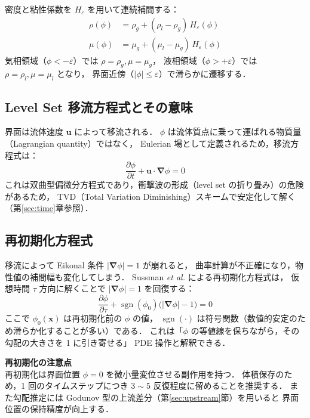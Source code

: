 \documentclass[12pt, a4paper, titlepage]{article}
\newcommand{\jp}[1]{{\normalfont\jpfont #1}}
\newcommand{\pd}[2]{\dfrac{\partial #1}{\partial #2}}
\newcommand{\bu}{\bm{u}}
\newcommand{\bnabla}{\bm{\nabla}}
\newcommand{\He}{H_\varepsilon}
\begin{document}
\jp{密度と粘性係数を $\He$ を用いて連続補間する：}
\begin{align}
  \rho(\phi) &= \rho_g + (\rho_l - \rho_g)\,\He(\phi)
  \label{eq:rho_interp}\\
  \mu(\phi)  &= \mu_g  + (\mu_l  - \mu_g )\,\He(\phi)
  \label{eq:mu_interp}
\end{align}
\jp{気相領域（$\phi<-\varepsilon$）では $\rho=\rho_g, \mu=\mu_g$，
液相領域（$\phi>+\varepsilon$）では $\rho=\rho_l, \mu=\mu_l$ となり，
界面近傍（$|\phi|\le\varepsilon$）で滑らかに遷移する．}

\subsection{Level Set \jp{移流方程式とその意味}}

\jp{界面は流体速度 $\bu$ によって移流される．
$\phi$ は流体質点に乗って運ばれる物質量（Lagrangian quantity）ではなく，
Eulerian 場として定義されるため，移流方程式は：}
\begin{equation}
  \pd{\phi}{t} + \bu \cdot \bnabla\phi = 0
  \label{eq:levelset_adv}
\end{equation}
\jp{これは双曲型偏微分方程式であり，衝撃波の形成（level set の折り畳み）の危険があるため，
TVD（Total Variation Diminishing）スキームで安定化して解く（第\ref{sec:time}章参照）．}

\subsection{\jp{再初期化方程式}}
\label{sec:reinit}

\jp{移流によって Eikonal 条件 $|\bnabla\phi|=1$ が崩れると，
曲率計算が不正確になり，物性値の補間幅も変化してしまう．
Sussman \textit{et al.} \cite{Sussman1994} による再初期化方程式は，
仮想時間 $\tau$ 方向に解くことで $|\bnabla\phi|=1$ を回復する：}
\begin{equation}
  \pd{\phi}{\tau} + \operatorname{sgn}(\phi_0)\bigl(|\bnabla\phi| - 1\bigr) = 0
  \label{eq:reinit}
\end{equation}
\jp{ここで $\phi_0(\bm{x})$ は再初期化前の $\phi$ の値，
$\operatorname{sgn}(\cdot)$ は符号関数（数値的安定のため滑らか化することが多い）である．
これは「$\phi$ の等値線を保ちながら，その勾配の大きさを 1 に引き寄せる」
PDE 操作と解釈できる．}

\begin{tcolorbox}[warnbox]
\textbf{\jp{再初期化の注意点}}\\
\jp{再初期化は界面位置 $\phi=0$ を微小量変位させる副作用を持つ．
体積保存のため，1 回のタイムステップにつき $3\sim5$ 反復程度に留めることを推奨する．
また勾配推定には Godunov 型の上流差分（第\ref{sec:upstream}節）を用いると
界面位置の保持精度が向上する．}
\end{tcolorbox}
\end{document}
